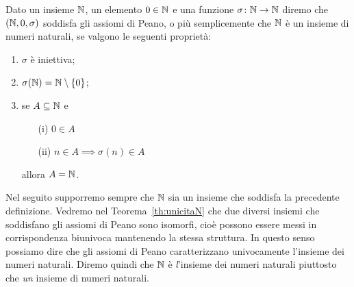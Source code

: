 \begin{definition}
  \label{def:assiomi_peano}%
  \label{def:naturali}%
  \index{$\NN$}%
Dato un insieme $\NN$, 
un elemento $0\in {\mathbb N}$ 
e una funzione $\sigma\colon {\mathbb N}\to{\mathbb N}$ 
diremo che $({\mathbb N},0,\sigma)$
soddisfa gli assiomi di Peano,
o più semplicemente che $\NN$ è un insieme di numeri naturali,
se valgono le seguenti proprietà: 
\begin{enumerate}
  \item $\sigma$ è iniettiva;
  \item $\sigma({\mathbb N}) = {\mathbb N} \setminus{\left\{ 0 \right\}}$;
  \item se $A\subseteq {\mathbb N}$ e 
  \begin{enumerate} 
    \item[(i)] $0\in A$ 
    \item[(ii)] $n\in A \implies \sigma(n)\in A$
  \end{enumerate}
  allora $A={\mathbb N}$.
\end{enumerate}
\end{definition}

Nel seguito supporremo sempre che $\NN$ sia un insieme che soddisfa la precedente definizione.
Vedremo nel Teorema~\ref{th:unicitaN} che due diversi insiemi che soddisfano gli assiomi di Peano 
sono isomorfi, cioè possono essere messi in corrispondenza biunivoca mantenendo la stessa struttura.
In questo senso possiamo dire che gli assiomi di Peano caratterizzano univocamente 
l'insieme dei numeri naturali. 
Diremo quindi che $\NN$ è \emph{l}'insieme dei numeri naturali piuttosto 
che \emph{un} insieme di numeri naturali.


